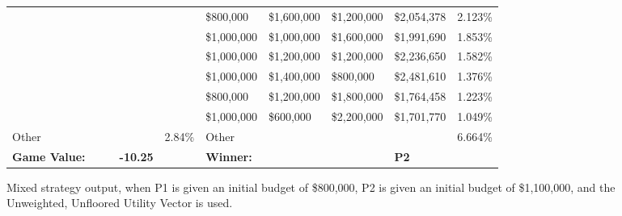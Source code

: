 \documentclass[11pt]{article}
\begin{document}
\begin{figure}
\begin{tabular}{ |p{1.0cm}p{1.0cm}p{1.0cm}p{2.0cm}|p{1.0cm}||p{1.0cm}p{1.0cm}p{1.0cm}p{2.0cm}|p{1.0cm}|}
& & & & & \$800,000 & \$1,600,000 & \$1,200,000 & \$2,054,378 & 2.123\% \\
& & & & & \$1,000,000 & \$1,000,000 & \$1,600,000 & \$1,991,690 & 1.853\% \\
& & & & & \$1,000,000 & \$1,200,000 & \$1,200,000 & \$2,236,650 & 1.582\% \\
& & & & & \$1,000,000 & \$1,400,000 & \$800,000 & \$2,481,610 & 1.376\% \\
& & & & & \$800,000 & \$1,200,000 & \$1,800,000 & \$1,764,458 & 1.223\% \\
& & & & & \$1,000,000 & \$600,000 & \$2,200,000 & \$1,701,770 & 1.049\% \\
\hline
Other& & & & 2.84\% & Other& & & & 6.664\% \\
\hline
\small \textbf{Game Value:} &&& \small \textbf{-10.25} && \small \textbf{Winner:} &&& \small \textbf{P2}&\\
\hline
\end{tabular}
\caption{Mixed strategy output, when P1 is given an initial budget of \$800,000, P2 is given an initial budget of \$1,100,000, and the Unweighted, Unfloored Utility Vector is used.}
\label{8v11table.4}
\end{figure}
\end{document}
